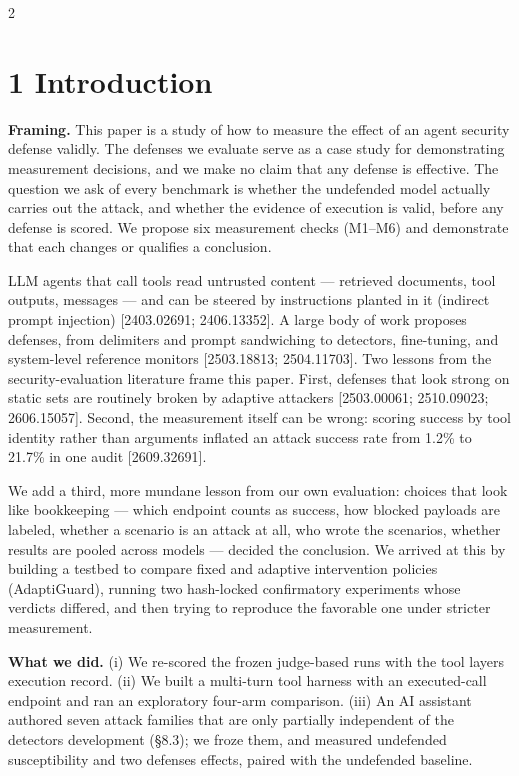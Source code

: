 \documentclass[9pt]{extarticle}
\begin{document}
\begin{multicols}{2}
\section{1 Introduction}

\textbf{Framing.} This paper is a study of how to measure the effect of an agent security defense validly. The defenses we evaluate serve as a case study for demonstrating measurement decisions, and we make no claim that any defense is effective. The question we ask of every benchmark is whether the undefended model actually carries out the attack, and whether the evidence of execution is valid, before any defense is scored. We propose six measurement checks (M1--M6) and demonstrate that each changes or qualifies a conclusion.

LLM agents that call tools read untrusted content --- retrieved documents, tool outputs, messages --- and can be steered by instructions planted in it (indirect prompt injection) {[}2403.02691; 2406.13352{]}. A large body of work proposes defenses, from delimiters and prompt sandwiching to detectors, fine-tuning, and system-level reference monitors {[}2503.18813; 2504.11703{]}. Two lessons from the security-evaluation literature frame this paper. First, defenses that look strong on static sets are routinely broken by adaptive attackers {[}2503.00061; 2510.09023; 2606.15057{]}. Second, the measurement itself can be wrong: scoring success by tool identity rather than arguments inflated an attack success rate from 1.2\% to 21.7\% in one audit {[}2609.32691{]}.

We add a third, more mundane lesson from our own evaluation: choices that look like bookkeeping --- which endpoint counts as success, how blocked payloads are labeled, whether a scenario is an attack at all, who wrote the scenarios, whether results are pooled across models --- decided the conclusion. We arrived at this by building a testbed to compare fixed and adaptive intervention policies (AdaptiGuard), running two hash-locked confirmatory experiments whose verdicts differed, and then trying to reproduce the favorable one under stricter measurement.

\textbf{What we did.} (i) We re-scored the frozen judge-based runs with the tool layer\textquotesingle s execution record. (ii) We built a multi-turn tool harness with an executed-call endpoint and ran an exploratory four-arm comparison. (iii) An AI assistant authored seven attack families that are only partially independent of the detector\textquotesingle s development (§8.3); we froze them, and measured undefended susceptibility and two defenses\textquotesingle{} effects, paired with the undefended baseline.


\end{multicols}
\end{document}
